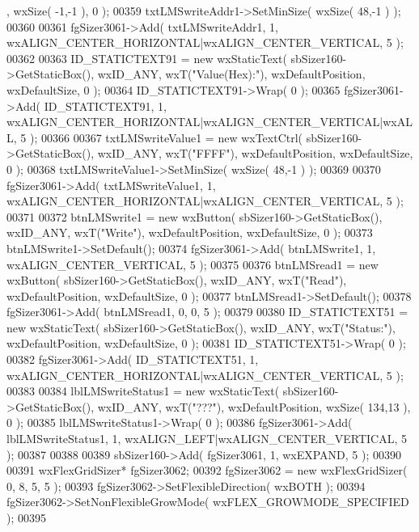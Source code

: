 \begin{DoxyCode}
      , wxSize( -1,-1 ), 0 );
00359     txtLMSwriteAddr1->SetMinSize( wxSize( 48,-1 ) );
00360     
00361     fgSizer3061->Add( txtLMSwriteAddr1, 1, wxALIGN\_CENTER\_HORIZONTAL|wxALIGN\_CENTER\_VERTICAL, 5 );
00362     
00363     ID_STATICTEXT91 = \textcolor{keyword}{new} wxStaticText( sbSizer160->GetStaticBox(), wxID\_ANY, wxT(\textcolor{stringliteral}{"Value(Hex):"}), 
      wxDefaultPosition, wxDefaultSize, 0 );
00364     ID_STATICTEXT91->Wrap( 0 );
00365     fgSizer3061->Add( ID_STATICTEXT91, 1, wxALIGN\_CENTER\_HORIZONTAL|wxALIGN\_CENTER\_VERTICAL|wxALL, 5 );
00366     
00367     txtLMSwriteValue1 = \textcolor{keyword}{new} wxTextCtrl( sbSizer160->GetStaticBox(), wxID\_ANY, wxT(\textcolor{stringliteral}{"FFFF"}), 
      wxDefaultPosition, wxDefaultSize, 0 );
00368     txtLMSwriteValue1->SetMinSize( wxSize( 48,-1 ) );
00369     
00370     fgSizer3061->Add( txtLMSwriteValue1, 1, wxALIGN\_CENTER\_HORIZONTAL|wxALIGN\_CENTER\_VERTICAL, 5 );
00371     
00372     btnLMSwrite1 = \textcolor{keyword}{new} wxButton( sbSizer160->GetStaticBox(), wxID\_ANY, wxT(\textcolor{stringliteral}{"Write"}), wxDefaultPosition, 
      wxDefaultSize, 0 );
00373     btnLMSwrite1->SetDefault(); 
00374     fgSizer3061->Add( btnLMSwrite1, 1, wxALIGN\_CENTER\_VERTICAL, 5 );
00375     
00376     btnLMSread1 = \textcolor{keyword}{new} wxButton( sbSizer160->GetStaticBox(), wxID\_ANY, wxT(\textcolor{stringliteral}{"Read"}), wxDefaultPosition, 
      wxDefaultSize, 0 );
00377     btnLMSread1->SetDefault(); 
00378     fgSizer3061->Add( btnLMSread1, 0, 0, 5 );
00379     
00380     ID_STATICTEXT51 = \textcolor{keyword}{new} wxStaticText( sbSizer160->GetStaticBox(), wxID\_ANY, wxT(\textcolor{stringliteral}{"Status:"}), 
      wxDefaultPosition, wxDefaultSize, 0 );
00381     ID_STATICTEXT51->Wrap( 0 );
00382     fgSizer3061->Add( ID_STATICTEXT51, 1, wxALIGN\_CENTER\_HORIZONTAL|wxALIGN\_CENTER\_VERTICAL, 5 );
00383     
00384     lblLMSwriteStatus1 = \textcolor{keyword}{new} wxStaticText( sbSizer160->GetStaticBox(), wxID\_ANY, wxT(\textcolor{stringliteral}{"???"}), 
      wxDefaultPosition, wxSize( 134,13 ), 0 );
00385     lblLMSwriteStatus1->Wrap( 0 );
00386     fgSizer3061->Add( lblLMSwriteStatus1, 1, wxALIGN\_LEFT|wxALIGN\_CENTER\_VERTICAL, 5 );
00387     
00388     
00389     sbSizer160->Add( fgSizer3061, 1, wxEXPAND, 5 );
00390     
00391     wxFlexGridSizer* fgSizer3062;
00392     fgSizer3062 = \textcolor{keyword}{new} wxFlexGridSizer( 0, 8, 5, 5 );
00393     fgSizer3062->SetFlexibleDirection( wxBOTH );
00394     fgSizer3062->SetNonFlexibleGrowMode( wxFLEX\_GROWMODE\_SPECIFIED );
00395     

\end{DoxyCode}
